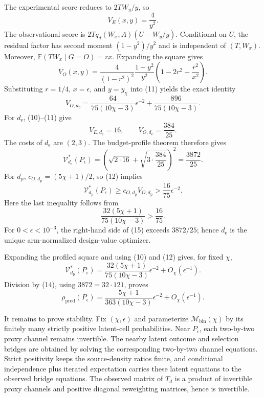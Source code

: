 The experimental score reduces to \(2TW_y/y\), so
\[
 V_E(x,y)=\frac4{y^2}. \tag{10}
\]
The observational score is \(2Tq_d(W_x,A)(U-W_y/y)\). Conditional on \(U\), the residual factor has second moment \((1-y^2)/y^2\) and is independent of \((T,W_x)\). Moreover, \(\mathbb E(TW_x\mid G=O)=rx\). Expanding the square gives
\[
 V_O(x,y)
 =\frac4{(1-r^2)^2}\frac{1-y^2}{y^2}
 \left(1-2r^2+\frac{r^2}{x^2}\right). \tag{11}
\]
Substituting \(r=1/4\), \(x=\epsilon\), and \(y=y_\chi\) into (11) yields the exact identity
\[
 V_{O,d_{\mathrm p}}
 =\frac{64}{75(10\chi-3)}\epsilon^{-2}
 +\frac{896}{75(10\chi-3)}. \tag{12}
\]
For \(d_{\mathrm e}\), (10)--(11) give
\[
 V_{E,d_{\mathrm e}}=16,
 \qquad V_{O,d_{\mathrm e}}=\frac{384}{25}. \tag{13}
\]
The costs of \(d_{\mathrm e}\) are \((2,3)\). The budget-profile theorem therefore gives
\[
 \mathcal V_{d_{\mathrm e}}^*(P_\epsilon)
 =\left(\sqrt{2\cdot16}+\sqrt{3\cdot\frac{384}{25}}\right)^2
 =\frac{3872}{25}. \tag{14}
\]
For \(d_{\mathrm p}\), \(c_{O,d_{\mathrm p}}=(5\chi+1)/2\), so (12) implies
\[
 \mathcal V_{d_{\mathrm p}}^*(P_\epsilon)
 \ge c_{O,d_{\mathrm p}}V_{O,d_{\mathrm p}}
 >\frac{16}{75}\epsilon^{-2}. \tag{15}
\]
Here the last inequality follows from
\[
 \frac{32(5\chi+1)}{75(10\chi-3)}>\frac{16}{75}.
\]
For \(0<\epsilon<10^{-3}\), the right-hand side of (15) exceeds \(3872/25\); hence \(d_{\mathrm e}\) is the unique arm-normalized design-value optimizer.

Expanding the profiled square and using (10) and (12) gives, for fixed \(\chi\),
\[
 \mathcal V_{d_{\mathrm p}}^*(P_\epsilon)
 =\frac{32(5\chi+1)}{75(10\chi-3)}\epsilon^{-2}
 +O_\chi(\epsilon^{-1}). \tag{16}
\]
Division by (14), using \(3872=32\cdot121\), proves
\[
 \rho_{\mathrm{pred}}(P_\epsilon)
 =\frac{5\chi+1}{363(10\chi-3)}\epsilon^{-2}
 +O_\chi(\epsilon^{-1}). \tag{17}
\]

It remains to prove stability. Fix \((\chi,\epsilon)\) and parameterize \(\mathcal M_{\mathrm{bin}}(\chi)\) by its finitely many strictly positive latent-cell probabilities. Near \(P_\epsilon\), each two-by-two proxy channel remains invertible. The nearby latent outcome and selection bridges are obtained by solving the corresponding two-by-two channel equations. Strict positivity keeps the source-density ratios finite, and conditional independence plus iterated expectation carries these latent equations to the observed bridge equations. The observed matrix of \(T_d\) is a product of invertible proxy channels and positive diagonal reweighting matrices, hence is invertible.


